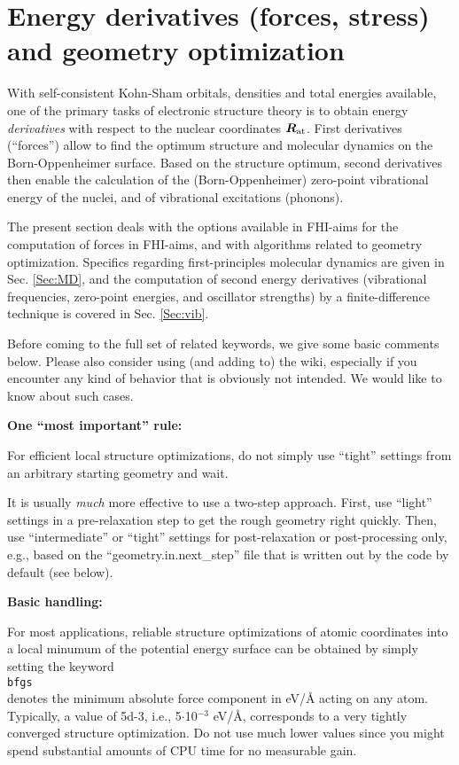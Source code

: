 \section{Energy derivatives (forces, stress) and geometry optimization}

With self-consistent Kohn-Sham orbitals, densities and total energies
available, one of the primary tasks of electronic structure theory is
to obtain energy \emph{derivatives} with respect to the nuclear
coordinates $\mbox{\boldmath$R$}_\text{at}$. First derivatives (``forces'') allow
to find the optimum structure and molecular dynamics on the
Born-Oppenheimer surface. Based on the structure optimum, second
derivatives then enable the calculation of the (Born-Oppenheimer)
zero-point vibrational energy of the nuclei, and of vibrational
excitations (phonons).

The present section deals with the options available in FHI-aims for
the computation of forces in FHI-aims, and with algorithms related to
geometry optimization. Specifics regarding first-principles molecular
dynamics are given in Sec. \ref{Sec:MD}, and the computation of second
energy derivatives (vibrational frequencies, zero-point energies, and
oscillator strengths) by a finite-difference technique is covered in 
Sec. \ref{Sec:vib}. 

Before coming to the full set of related keywords, 
we give some basic comments below. Please also consider using (and 
adding to) the wiki, especially if you encounter any kind of behavior
that is obviously not intended. We would like to know about such
cases. 

\textbf{One ``most important'' rule:}

For efficient local structure optimizations, do not simply use
``tight'' settings from an arbitrary starting geometry and wait.

It is usually \emph{much} more effective to use a two-step
approach. First, use ``light'' settings in a pre-relaxation
step to get the rough geometry right quickly. Then, use
``intermediate'' or ``tight'' settings for post-relaxation or
post-processing only, e.g., based on the ``geometry.in.next\_step''
file that is written out by the code by default (see below).

\textbf{Basic handling:}

For most applications, reliable structure optimizations of
atomic coordinates into a local minumum of the potential energy
surface can be obtained by simply setting the keyword \\
 \texttt{bfgs}  \\
 denotes the minimum absolute force component in
eV/{\AA} acting on any atom. Typically, a  value of
5d-3, i.e., 5$\cdot$10$^{-3}$ eV/{\AA}, corresponds to a very tightly 
converged structure optimization. Do not use much lower values since
you might spend substantial amounts of CPU time for no measurable gain.

